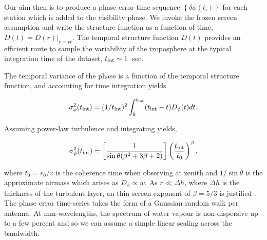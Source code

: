 Our aim then is to produce a phase error time sequence $\left\{\delta \phi(t_i)\right\}$ for each station which is added to the visibility phase. We invoke the frozen screen assumption and write the structure function as a function of time, $D (t) =  D(r)|_{r=vt}$. The temporal structure function $D(t)$ provides an efficient route to sample the variability of the troposphere at the typical integration time of the dataset, $t_{\rm int} \sim 1$~sec. 

The temporal variance of the phase is a function of the temporal structure function, and accounting for time integration yields \citep*[see][B3]{Treuhaft_1987} 

\begin{equation}
\sigma^2_{\phi}(t_{\rm int}) = (1/t_{\rm int})^2 \int_{0}^{t_{\rm int}} (t_{\rm int}-t) D_{\phi}(t) dt.
\end{equation}

Assuming power-law turbulence and integrating yields, 

\begin{equation}\label{eq:turb_final}
\sigma^2_\phi (t_{\rm int})=\left[\frac{1}{\sin\theta(\beta^2 +3\beta +2)}\right]\left(\frac{t_{\rm int}}{t_0}\right)^{\beta},
\end{equation}


\noindent where $t_0 = r_0/v$ is the coherence time when observing at zenith and $1/\sin\theta$ is the approximate airmass which arises as $D_\phi \propto w$. As $r \ll \Delta h$, where $\Delta h$ is the thickness of the turbulent layer, an thin screen exponent of $\beta = 5/3$ is justified \citep*{Treuhaft_1987}. The phase error time-series takes the form of a Gaussian random walk per antenna. At mm-wavelengths, the spectrum of water vapour is non-dispersive up to a few percent \citep{Curtis_2009} and so we can assume a simple linear scaling across the bandwidth.



